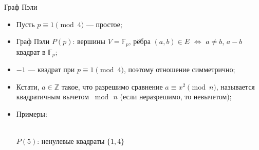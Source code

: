 \documentclass[serif, aspectratio=169]{beamer}
\begin{document}
\begin{frame}{Граф Пэли}
    \begin{itemize}
        \item Пусть $p\equiv1\pmod4$ --- простое;
        \item Граф Пэли $P(p)$: вершины $V=\mathbb{F}_p$, рёбра $(a,b)\in E$ $\Leftrightarrow$ $a\neq b$, $a-b$ квадрат в $\mathbb{F}_p$;
        \item $-1$ --- квадрат при $p\equiv1\pmod4$, поэтому отношение симметрично;
        \item Кстати, $a\in\mathbb{Z}$ такое, что разрешимо сравнение $a\equiv x^2 \pmod{n}$, называется квадратичным вычетом $\bmod\, n$ (если неразрешимо, то невычетом);
        \item Примеры:
        \vspace{-2ex}
        \begin{center}
            \begin{actionenv}
            \begin{minipage}[t]{0.45\linewidth}
                \centering
                \\[-0.5ex]
                {\scriptsize $P(5)$: ненулевые квадраты $\{1,4\}$}
            \end{minipage}
            \end{actionenv}
            \begin{actionenv}
            \begin{minipage}[t]{0.45\linewidth}
                \centering
\end{minipage}
\end{actionenv}
\end{center}
\end{itemize}
\end{frame}
\end{document}
